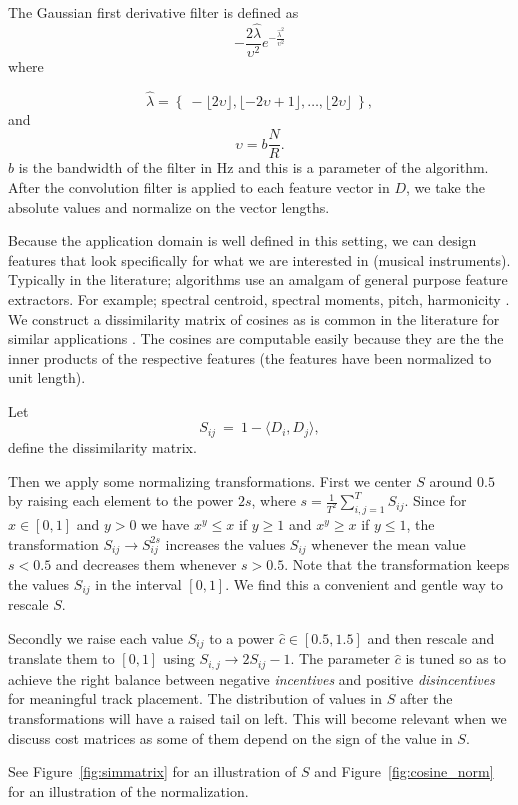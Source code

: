 \documentclass[twocolumn]{article}
\begin{document}
	The Gaussian first derivative filter is defined as 
	$$- \frac{2 \hat{\lambda}}{\upsilon^2}  e^{-\frac{\hat{\lambda}^2}{\upsilon^2}} $$ where 
	
	$$\hat{\lambda}=\left\{~-\lfloor 2\upsilon\rfloor,\lfloor-2\upsilon+1\rfloor,\ldots, \lfloor 2 \upsilon \rfloor~\right\},$$ and $$\upsilon = b  \frac{N}{R} .$$ $b$ is the bandwidth of the filter in Hz and this is a parameter of the algorithm. After the convolution filter is applied to each feature vector in $D$, we take the absolute values and normalize on the vector lengths.  
	
	Because the application domain is well defined in this setting, we can design features that look specifically for what we are interested in (musical instruments). Typically in the literature; algorithms use an amalgam of general purpose feature extractors. For example; spectral centroid, spectral moments, pitch, harmonicity \cite{tzanetakis1999framework}. We construct a dissimilarity matrix of cosines as is common in the literature for similar applications \cite{foote1999visualizing}. The cosines are computable easily because they are the the inner products of the respective features (the features have been normalized to unit length).
	
	Let
	\[
	S_{ij} ~=~ 1-\langle D_{i}, D_{j}\rangle,
	\] define the dissimilarity matrix.
	
Then we apply some normalizing transformations. First we center $S$
around $0.5$ by raising each element to the power $2s$, where
$s=\frac{1}{T^2}\sum_{i,j=1}^TS_{ij}$. Since for $x\in [0,1]$ and
$y>0$ we have $x^y\le x$ if $y\ge 1$ and $x^y\ge x$ if $y\le 1$, the
transformation $S_{ij}\to S_{ij}^{2s}$ increases the values $S_{ij}$
whenever the mean value $s<0.5$ and decreases them whenever
$s>0.5$. Note that the transformation keeps the values $S_{ij}$ in the
interval $[0,1]$. We find this a convenient and gentle way to rescale
$S$.

Secondly we raise each value $S_{ij}$ to a power $\hat c \in
[0.5,1.5]$ and then rescale and translate them to $[0,1]$ using
$S_{i,j}\to 2S_{ij}-1$.  The parameter $\hat c$ is tuned so as to
achieve the right balance between negative \textit{incentives} and
positive \textit{disincentives} for meaningful track placement. The
distribution of values in $S$ after the transformations will have a
raised tail on left. This will become relevant when we discuss cost
matrices as some of them depend on the sign of the value in $S$.
	
	See Figure~\ref{fig:simmatrix} for an illustration of $S$ and Figure~\ref{fig:cosine_norm} for an illustration of the  normalization.
	
\end{document}
